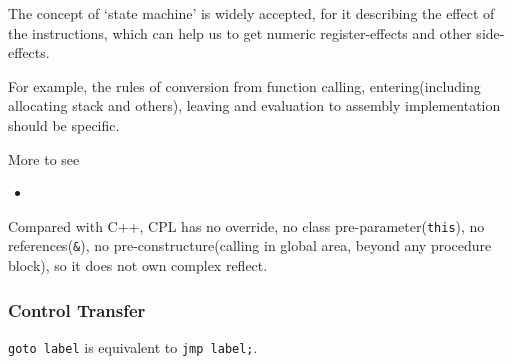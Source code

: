 The concept of `state machine' is widely accepted, for it describing the effect of the instructions, which can help us to get numeric register-effects and other side-effects.

For example, the rules of conversion from function calling, entering(including allocating stack and others), leaving and evaluation to assembly implementation should be specific.

More to see

\begin{itemize}

\item 
{}\end{itemize}

Compared with C++, CPL has no override, no class pre-parameter(\verb|this|), no references(\verb|&|), no pre-constructure(calling in global area, beyond any procedure block), so it does not own complex reflect.



\subsubsection{Control Transfer}

\verb|goto label| is equivalent to \verb|jmp label;|.

